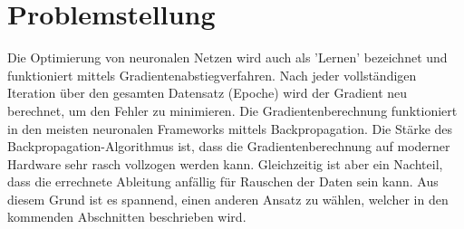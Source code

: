 %
%
%
\section{Problemstellung
\label{ableitung:section:problemstellung}}
Die Optimierung von neuronalen Netzen wird auch als 'Lernen' bezeichnet und funktioniert mittels Gradientenabstiegverfahren.
Nach jeder vollständigen Iteration über den gesamten Datensatz (Epoche) wird der Gradient neu berechnet, um den Fehler zu minimieren. Die Gradientenberechnung funktioniert in den meisten neuronalen Frameworks mittels Backpropagation. Die Stärke des Backpropagation-Algorithmus ist, dass die Gradientenberechnung auf moderner Hardware sehr rasch vollzogen werden kann. Gleichzeitig ist aber ein Nachteil, dass die errechnete Ableitung anfällig für Rauschen der Daten sein kann. Aus diesem Grund ist es spannend, einen anderen Ansatz zu wählen, welcher in den kommenden Abschnitten beschrieben wird.

